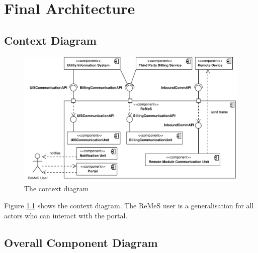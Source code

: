 \chapter{Final Architecture}
\label{chap:final-architecture}

\section{Context Diagram}

\begin{figure}
	\begin{centering}
		\includegraphics[width=\textwidth]{figs/final-context.pdf}
		\caption{The context diagram}
		\label{fig:final-context}
	\end{centering}
\end{figure}

\npar Figure \ref{fig:final-context} shows the context diagram. The ReMeS
user is a generalisation for all actors who can interact with the portal. 

\section{Overall Component Diagram}

